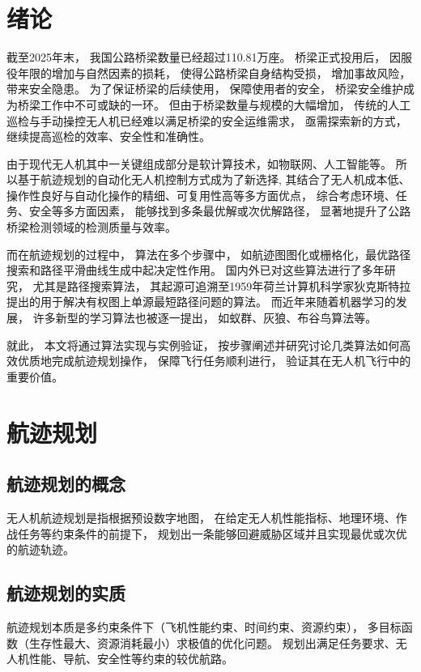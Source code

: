\documentclass[12pt,a4paper,oneside,UTF8]{ctexart}
\begin{document}
\newpage\setcounter{page}{1}\section{绪论}
截至2025年末，
我国公路桥梁数量已经超过110.81万座\textsuperscript{\cite{ref1}}。
桥梁正式投用后，
因服役年限的增加与自然因素的损耗，
使得公路桥梁自身结构受损，
增加事故风险，
带来安全隐患。
为了保证桥梁的后续使用，
保障使用者的安全，
桥梁安全维护成为桥梁工作中不可或缺的一环。
但由于桥梁数量与规模的大幅增加，
传统的人工巡检与手动操控无人机已经难以满足桥梁的安全运维需求，
亟需探索新的方式，继续提高巡检的效率、安全性和准确性\textsuperscript{\cite{ref2}}。

由于现代无人机其中一关键组成部分是软计算技术，如物联网、人工智能等\textsuperscript{\cite{addref1}}。
所以基于航迹规划的自动化无人机控制方式成为了新选择,
其结合了无人机成本低、操作性良好与自动化操作的精细、可复用性高等多方面优点，
综合考虑环境、任务、安全等多方面因素，
能够找到多条最优解或次优解路径，
显著地提升了公路桥梁检测领域的检测质量与效率。

而在航迹规划的过程中，
算法在多个步骤中，
如航迹图图化或栅格化，最优路径搜索和路径平滑曲线生成中起决定性作用。
国内外已对这些算法进行了多年研究，
尤其是路径搜索算法，
其起源可追溯至1959年荷兰计算机科学家狄克斯特拉提出的用于解决有权图上单源最短路径问题的算法。
而近年来随着机器学习的发展，
许多新型的学习算法也被逐一提出，
如蚁群、灰狼、布谷鸟算法等。

就此，
本文将通过算法实现与实例验证，
按步骤阐述并研究讨论几类算法如何高效优质地完成航迹规划操作，
保障飞行任务顺利进行，
验证其在无人机飞行中的重要价值。
\newpage\section{航迹规划}

\subsection{航迹规划的概念}
无人机航迹规划是指根据预设数字地图，
在给定无人机性能指标、地理环境、作战任务等约束条件的前提下，
规划出一条能够回避威胁区域并且实现最优或次优的航迹轨迹。

\subsection{航迹规划的实质}
航迹规划本质是多约束条件下（飞机性能约束、时间约束、资源约束），
多目标函数（生存性最大、资源消耗最小）求极值的优化问题。
规划出满足任务要求、无人机性能、导航、安全性等约束的较优航路。
\end{document}
